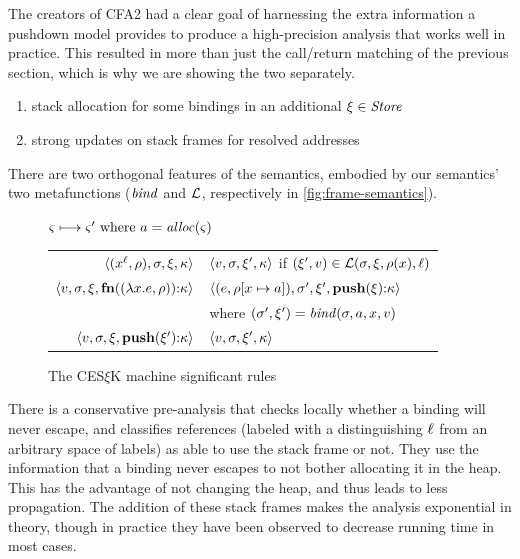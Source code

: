 The creators of CFA2 had a clear goal of harnessing the extra information a pushdown model provides to produce a high-precision analysis that works well in practice.
%
This resulted in more than just the call/return matching of the previous section, which is why we are showing the two separately.
%

\begin{enumerate}
\item{stack allocation for some bindings in an additional $\mframe \in \Store$}
\item{strong updates on stack frames for resolved addresses}
\end{enumerate}
There are two orthogonal features of the semantics, embodied by our semantics' two metafunctions ($\bind$ and $\lookup$, respectively in \autoref{fig:frame-semantics}).

\begin{figure}
  \centering
  $\mstate \stepto \mstate' \text{ where } \maddr = \alloc(\mstate)$ \\
  \begin{tabular}{r|l}
    \hline
    $\tpl{(\svar[\mlab]{\mvar}, \menv), \mstore, \mframe, \mkont}$
    &
    $\tpl{\mval,\mstore,\mframe',\mkont}$ if $(\mframe', \mval) \in \lookup(\mstore,\mframe,\menv(\mvar),\mlab)$
    \\
    $\tpl{\mval,\mstore,\mframe,\kcons{\kfn{\vclo{\slam{\mvar}{\mexpr}}{\menv}}}{\mkont}}$
    &
    $\tpl{(\mexpr, \extm{\menv}{\mvar}{\maddr}), \mstore', \mframe', \kcons{\kpush{\mframe}}{\mkont}}$
    \\ & where $(\mstore',\mframe') = \bind(\mstore,\maddr,\mvar,\mval)$
    \\
    $\tpl{\mval,\mstore,\mframe,\kcons{\kpush{\mframe'}}{\mkont}}$
    &
    $\tpl{\mval,\mstore,\mframe',\mkont}$
  \end{tabular}
  \caption{The CES$\xi$K machine significant rules}
  \label{fig:frame-semantics}
\end{figure}

%
There is a conservative pre-analysis that checks locally whether a binding will never escape, and classifies references (labeled with a distinguishing $\mlab$ from an arbitrary space of labels) as able to use the stack frame or not.
%
%
They use the information that a binding never escapes to not bother allocating it in the heap.
%
This has the advantage of not changing the heap, and thus leads to less propagation.
%
The addition of these stack frames makes the analysis exponential in theory, though in practice they have been observed to decrease running time in most cases.

